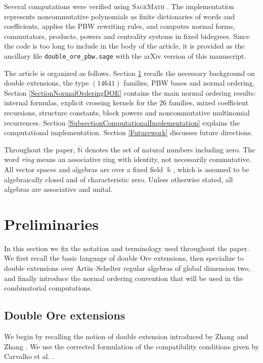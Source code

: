 \documentclass{amsart}
\theoremstyle{definition}
\theoremstyle{remark}
\numberwithin{equation}{section}
\begin{document}
Several computations were verified using \textsc{SageMath} \cite{SageMath2026}. The implementation represents noncommutative polynomials as finite dictionaries of words and coefficients, applies the PBW rewriting rules, and computes normal forms, commutators, products, powers and centrality systems in fixed bidegrees. Since the code is too long to include in the body of the article, it is provided as the ancillary file \texttt{double\_ore\_pbw.sage} with the arXiv version of this manuscript.

The article is organized as follows. Section \ref{Preliminaries} recalls the necessary background on double extensions, the type $(14641)$ families, PBW bases and normal ordering. Section \ref{SectionNormalOrderingDOE} contains the main normal ordering results: internal formulas, explicit crossing kernels for the $26$ families, mixed coefficient recursions, structure constants, block powers and noncommutative multinomial recurrences. Section \ref{SubsectionComputationalImplementation} explains the computational implementation. Section \ref{Futurework} discusses future directions.

Throughout the paper, $\bar{\mathbb{N}}$ denotes the set of natural numbers including zero. The word \emph{ring} means an associative ring with identity, not necessarily commutative. All vector spaces and algebras are over a fixed field $\Bbbk$, which is assumed to be algebraically closed and of characteristic zero. Unless otherwise stated, all algebras are associative and unital.
\section{Preliminaries}\label{Preliminaries}

In this section we fix the notation and terminology used throughout the paper. We first recall the basic language of double Ore extensions, then specialize to double extensions over Artin--Schelter regular algebras of global dimension two, and finally introduce the normal ordering convention that will be used in the combinatorial computations.

\subsection{Double Ore extensions}\label{SubsectionDoubleOreExtensions}

We begin by recalling the notion of double extension introduced by Zhang and Zhang \cite{ZhangZhang2008}. We use the corrected formulation of the compatibility conditions given by Carvalho et al. \cite{Carvalhoetal2011}.
\end{document}
